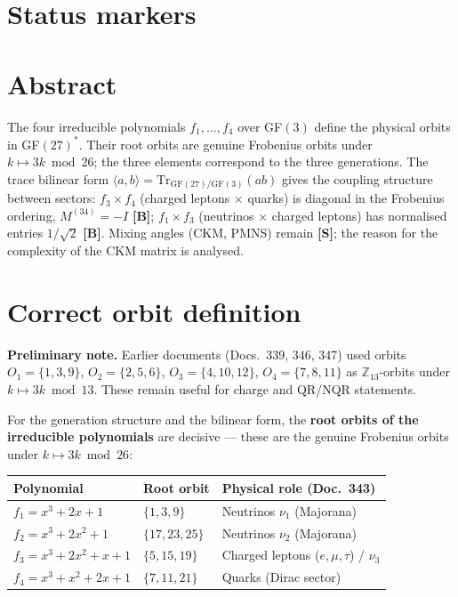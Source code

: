 
\providecommand{\BM}{\textbf{[B]}}
\providecommand{\KM}{\textbf{[K]}}
\providecommand{\SM}{\textbf{[S]}}

{}

\section*{Status markers}


\section*{Abstract}

The four irreducible polynomials $f_1,\ldots,f_4$ over GF$(3)$ define the
physical orbits in GF$(27)^*$. Their root orbits are genuine Frobenius orbits
under $k\mapsto3k\bmod26$; the three elements correspond to the three
generations. The trace bilinear form $\langle a,b\rangle=\mathrm{Tr}_{\mathrm{GF}(27)/\mathrm{GF}(3)}(ab)$
gives the coupling structure between sectors: $f_3\times f_4$ (charged leptons
$\times$ quarks) is diagonal in the Frobenius ordering, $M^{(34)}=-I$ \BM; $f_1\times f_3$ (neutrinos $\times$
charged leptons) has normalised entries $1/\sqrt{2}$ \BM. Mixing angles (CKM,
PMNS) remain \SM; the reason for the complexity of the CKM matrix is analysed.

\section{Correct orbit definition}

\textbf{Preliminary note.} Earlier documents (Docs.~339, 346, 347) used orbits
$O_1=\{1,3,9\}$, $O_2=\{2,5,6\}$, $O_3=\{4,10,12\}$, $O_4=\{7,8,11\}$ as
$\mathbb{Z}_{13}$-orbits under $k\mapsto3k\bmod13$. These remain useful for
charge and QR/NQR statements.

For the generation structure and the bilinear form, the \textbf{root orbits of
the irreducible polynomials} are decisive --- these are the genuine Frobenius
orbits under $k\mapsto3k\bmod26$:

\begin{center}
\begin{tabular}{lll}
\toprule
Polynomial & Root orbit & Physical role (Doc.~343) \\
\midrule
$f_1=x^3+2x+1$ & $\{1,3,9\}$ & Neutrinos $\nu_1$ (Majorana) \\
$f_2=x^3+2x^2+1$ & $\{17,23,25\}$ & Neutrinos $\nu_2$ (Majorana) \\
$f_3=x^3+2x^2+x+1$ & $\{5,15,19\}$ & Charged leptons ($e,\mu,\tau$) / $\nu_3$ \\
$f_4=x^3+x^2+2x+1$ & $\{7,11,21\}$ & Quarks (Dirac sector) \\
\bottomrule
\end{tabular}
\end{center}

